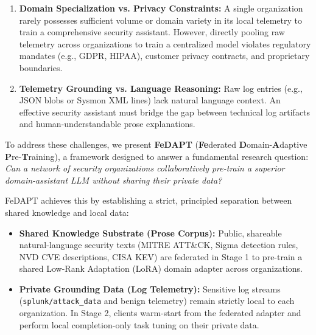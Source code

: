 \documentclass[11pt,a4paper]{article}
\begin{document}
\begin{enumerate}
    \item \textbf{Domain Specialization vs. Privacy Constraints:} A single organization rarely possesses sufficient volume or domain variety in its local telemetry to train a comprehensive security assistant. However, directly pooling raw telemetry across organizations to train a centralized model violates regulatory mandates (e.g., GDPR, HIPAA), customer privacy contracts, and proprietary boundaries.
    \item \textbf{Telemetry Grounding vs. Language Reasoning:} Raw log entries (e.g., JSON blobs or Sysmon XML lines) lack natural language context. An effective security assistant must bridge the gap between technical log artifacts and human-understandable prose explanations.
\end{enumerate}

To address these challenges, we present \textbf{FeDAPT} (\textbf{Fe}derated \textbf{D}omain-\textbf{A}daptive \textbf{P}re-\textbf{T}raining), a framework designed to answer a fundamental research question: \emph{Can a network of security organizations collaboratively pre-train a superior domain-assistant LLM without sharing their private data?}

FeDAPT achieves this by establishing a strict, principled separation between shared knowledge and local data:
\begin{itemize}
    \item \textbf{Shared Knowledge Substrate (Prose Corpus):} Public, shareable natural-language security texts (MITRE ATT\&CK, Sigma detection rules, NVD CVE descriptions, CISA KEV) are federated in Stage 1 to pre-train a shared Low-Rank Adaptation (LoRA) domain adapter across organizations.
    \item \textbf{Private Grounding Data (Log Telemetry):} Sensitive log streams (\texttt{splunk/attack\_data} and benign telemetry) remain strictly local to each organization. In Stage 2, clients warm-start from the federated adapter and perform local completion-only task tuning on their private data.
\end{itemize}
\end{document}
